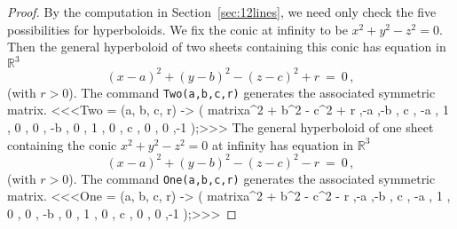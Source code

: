 \begin{proof}
By the computation in Section~\ref{sec:12lines}, 
we need only check the five possibilities for hyperboloids.
We fix the conic at infinity to be $x^2+y^2-z^2=0$.
Then the general hyperboloid of two sheets containing this conic has
equation in ${\mathbb R}^3$
%
\begin{equation}\label{eq:twoSheet}
  (x-a)^2+(y-b)^2-(z-c)^2+r\ =\ 0\,,
\end{equation}
%
(with $r>0$).
The command {\tt Two(a,b,c,r)} generates the associated 
symmetric matrix.
%
<<<Two = (a, b, c, r) -> (
     matrix{{a^2 + b^2 - c^2 + r ,-a ,-b , c },
            {         -a         , 1 , 0 , 0 },
            {         -b         , 0 , 1 , 0 },
            {          c         , 0 , 0 ,-1 }}
     );>>>
The general hyperboloid of one sheet containing the conic
$x^2+y^2-z^2=0$ at infinity has equation in ${\mathbb R}^3$
%
\begin{equation}\label{eq:oneSheet}
  (x-a)^2+(y-b)^2-(z-c)^2-r\ =\ 0\,,
\end{equation}
%
(with $r>0$).
The command {\tt One(a,b,c,r)} generates the associated 
symmetric matrix.
%
<<<One = (a, b, c, r) -> (
     matrix{{a^2 + b^2 - c^2 - r ,-a ,-b , c },
            {         -a         , 1 , 0 , 0 },
            {         -b         , 0 , 1 , 0 },
            {          c         , 0 , 0 ,-1 }}
     );>>>


\end{proof}
